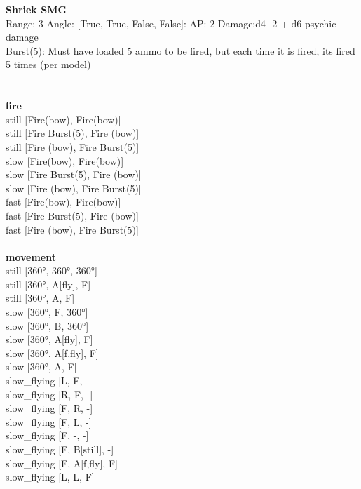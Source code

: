 {\bf Shriek SMG } \\



Range: 3  Angle: [True, True, False, False]: AP: 2 Damage:d4 -2 + d6 psychic damage \\
Burst(5): Must have loaded 5 ammo to be fired, but each time it is fired, its fired 5 times (per model)\\ 




 
\ \\



\ \\ {\bf fire } \\
still [Fire(bow), Fire(bow)] \\
still [Fire Burst(5), Fire (bow)] \\
still [Fire (bow), Fire Burst(5)] \\
slow [Fire(bow), Fire(bow)] \\
slow [Fire Burst(5), Fire (bow)] \\
slow [Fire (bow), Fire Burst(5)] \\
fast [Fire(bow), Fire(bow)] \\
fast [Fire Burst(5), Fire (bow)] \\
fast [Fire (bow), Fire Burst(5)] \\
\ \\ {\bf movement } \\
still [360°, 360°, 360°] \\
still [360°, A[fly], F] \\
still [360°, A, F] \\
slow [360°, F, 360°] \\
slow [360°, B, 360°] \\
slow [360°, A[fly], F] \\
slow [360°, A[f,fly], F] \\
slow [360°, A, F] \\
slow_flying [L, F, -] \\
slow_flying [R, F, -] \\
slow_flying [F, R, -] \\
slow_flying [F, L, -] \\
slow_flying [F, -, -] \\
slow_flying [F, B[still], -] \\
slow_flying [F, A[f,fly], F] \\
slow_flying [L, L, F] \\
